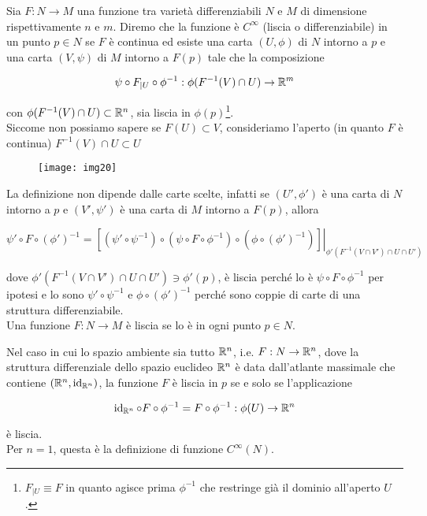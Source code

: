 Sia $ F : N \to M $ una funzione tra varietà differenziabili $ N $ e $ M $ di dimensione rispettivamente $ n $ e $ m $. Diremo che la funzione è $ C^{\infty} $ (liscia o differenziabile) in un punto $ p \in N $ se $ F $ è continua ed esiste una carta $ (U,\phi) $ di $ N $ intorno a $ p $ e una carta $ (V,\psi) $ di $ M $ intorno a $ F(p) $ tale che la composizione

\begin{equation}
	\psi \circ F_{|U} \circ \phi^{-1} : \phi(F^{-1}(V) \cap U) \to \mathbb{R}^{m}
\end{equation}

con $ \phi(F^{-1}(V) \cap U) \subset \mathbb{R}^{n} $, sia liscia in $ \phi(p) $\footnote{%
	$ F_{|U} \equiv F $ in quanto agisce prima $ \phi^{-1} $ che restringe già il dominio all'aperto $ U $.%
}.\\
Siccome non possiamo sapere se $ F(U) \subset V $, consideriamo l'aperto (in quanto $ F $ è continua) $ F^{-1}(V) \cap U \subset U $

\begin{figure}[H]
	\centering
	\texttt{[image: img20]}
\end{figure}

La definizione non dipende dalle carte scelte, infatti se $ (U',\phi') $ è una carta di $ N $ intorno a $ p $ e $ (V',\psi') $ è una carta di $ M $ intorno a $ F(p) $, allora

\begin{equation}
	\psi' \circ F \circ (\phi')^{-1} = \left. [(\psi' \circ \psi^{-1}) \circ (\psi \circ F \circ \phi^{-1}) \circ (\phi \circ (\phi')^{-1})] \right|_{\phi'(F^{-1}(V \cap V') \cap U \cap U')}
\end{equation}

dove $ \phi'(F^{-1}(V \cap V') \cap U \cap U') \ni \phi'(p) $, è liscia perché lo è $ \psi \circ F \circ \phi^{-1} $ per ipotesi e lo sono $ \psi' \circ \psi^{-1} $ e $ \phi \circ (\phi')^{-1} $ perché sono coppie di carte di una struttura differenziabile.\\
Una funzione $ F : N \to M $ è liscia se lo è in ogni punto $ p \in N $.

\begin{remark}
	Nel caso in cui lo spazio ambiente sia tutto $ \mathbb{R}^{n} $, i.e. $ F : N \to \mathbb{R}^{n} $, dove la struttura differenziale dello spazio euclideo $ \mathbb{R}^{n} $ è data dall'atlante massimale che contiene $ (\mathbb{R}^{n},\operatorname{id}_{\mathbb{R}^{n}}) $, la funzione $ F $ è liscia in $ p $ se e solo se l'applicazione
	
	\begin{equation}
		\operatorname{id}_{\mathbb{R}^{n}} \circ F \circ \phi^{-1} = F \circ \phi^{-1} : \phi(U) \to \mathbb{R}^{n}
	\end{equation}

	è liscia.\\
	Per $ n=1 $, questa è la definizione di funzione $ C^{\infty}(N) $.
\end{remark}

